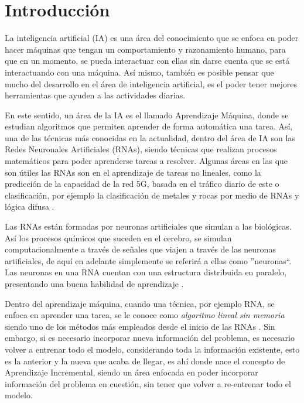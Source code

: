 \section{Introducción}

    La inteligencia artificial (IA) es una área del conocimiento que se enfoca en poder hacer máquinas 
    que tengan un comportamiento y razonamiento humano, para que en un momento, se pueda interactuar con 
    ellas sin darse cuenta que se est\'a interactuando con una máquina. Así mismo, también es posible 
    pensar que mucho del desarrollo en el área de inteligencia artificial, es el poder tener 
    mejores herramientas que ayuden a las actividades diarias. 

    En este sentido, un área de la IA es el llamado Aprendizaje Máquina, donde se estudian algoritmos
    que permiten aprender de forma automática una tarea. Así, una de las técnicas más conocidas en la 
    actualidad, dentro del área de IA son las Redes Neuronales Artificiales (RNAs), siendo técnicas que 
    realizan procesos matemáticos para poder aprenderse tareas a resolver. Algunas áreas en las que
    son útiles las RNAs son en el aprendizaje de tareas no lineales, como la predicción de
    la capacidad de la red 5G, basada en el tráfico diario de este \cite{zhao2022} o clasificación, por ejemplo 
    la clasificación de metales y rocas por medio de RNAs y lógica difusa \cite{salazar2013}.

    Las RNAs están formadas por neuronas artificiales que simulan a las biológicas. Así los procesos
    químicos que suceden en el cerebro, se simulan computacionalmente a través de señales que viajen
    a través de las neuronas artificiales, de aquí en adelante simplemente se referirá a ellas como 
    ''neuronas``. Las neuronas en una RNA cuentan con una estructura distribuida en paralelo, presentando 
    una buena habilidad de aprendizaje \cite{liu2015}.

    Dentro del aprendizaje máquina, cuando una técnica, por ejemplo RNA, se enfoca en aprender una tarea, se le 
    conoce como \textit{algoritmo lineal sin memoria} siendo uno de los métodos más empleados desde el
    inicio de las RNAs \cite{GiraudCarrier2000}. Sin embargo, si es necesario incorporar nueva
    información del problema,  es necesario volver a entrenar todo el modelo, considerando toda 
    la información existente, esto es la anterior y la nueva que acaba de llegar, es ahí donde nace el
    concepto de Aprendizaje Incremental, siendo un área enfocada en poder incorporar información 
    del problema en cuestión, sin tener que volver a re-entrenar todo el modelo.

